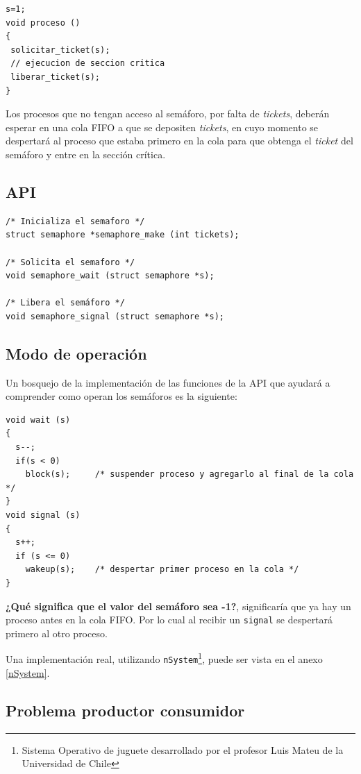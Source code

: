 \begin{lstlisting}
s=1;
void proceso ()
{
 solicitar_ticket(s);
 // ejecucion de seccion critica
 liberar_ticket(s);
}
\end{lstlisting}

Los procesos que no tengan acceso al semáforo, por falta de \emph{tickets},
deberán esperar en una cola FIFO a que se depositen \emph{tickets}, en cuyo
momento se despertará al proceso que estaba primero en la cola para que obtenga
el \emph{ticket} del semáforo y entre en la sección crítica.

\subsection{API}

\begin{lstlisting}
/* Inicializa el semaforo */
struct semaphore *semaphore_make (int tickets);

/* Solicita el semaforo */
void semaphore_wait (struct semaphore *s);

/* Libera el semáforo */
void semaphore_signal (struct semaphore *s);
\end{lstlisting}

\subsection{Modo de operación}
Un bosquejo de la implementación de las funciones de la API que ayudará a
comprender como operan los semáforos es la siguiente:

\begin{lstlisting}
void wait (s)
{
  s--;
  if(s < 0)
    block(s);     /* suspender proceso y agregarlo al final de la cola */
}
void signal (s)
{
  s++;
  if (s <= 0)
    wakeup(s);    /* despertar primer proceso en la cola */
}
\end{lstlisting}

\textbf{¿Qué significa que el valor del semáforo sea -1?}, significaría que ya
hay un proceso antes en la cola FIFO. Por lo cual al recibir un \texttt{signal}
se despertará primero al otro proceso.

Una implementación real, utilizando \texttt{nSystem}\footnote{Sistema
Operativo de juguete desarrollado por el profesor Luis Mateu de la Universidad
de Chile}, puede ser vista en el anexo \ref{nSystem}.

\subsection{Problema productor consumidor}

